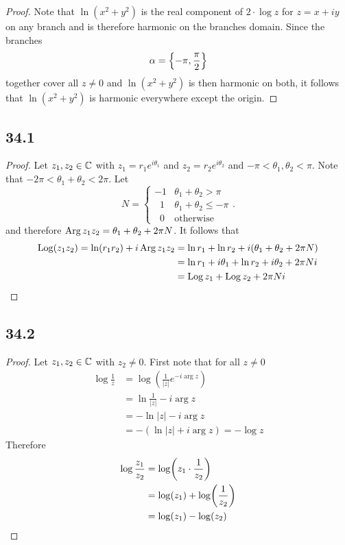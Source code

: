 \documentclass[12pt,titlepage]{extarticle}
\begin{document}
\begin{proof}
    Note that $\ln(x^2 + y^2)$ is the real component of $2\cdot\log z$ for $z = x + iy$ on any branch and is therefore harmonic on the branches domain. Since the branches
    \[
        \alpha = \qty{-\pi, \frac{\pi}{2}}
    \]
    together cover all $z \neq 0$ and $\ln(x^2 + y^2)$ is then harmonic on both, it follows that $\ln(x^2 + y^2)$ is harmonic everywhere except the origin.
\end{proof}

\subsection*{34.1}
\begin{proof}
    Let $z_1, z_2 \in \mathbb{C}$ with $z_1 = r_1 e^{i \theta_1}$ and $z_2 = r_2 e^{i \theta_2}$ and $- \pi < \theta_1, \theta_2 < \pi$. Note that $- 2 \pi < \theta_1 + \theta_2 < 2 \pi$. Let
    \[
        N = \begin{cases}
            -1 & \theta_1 + \theta_2 > \pi \\
            \;\;1 & \theta_1 + \theta_2 \leq -\pi \\
            \;\;0 & \text{otherwise}
        \end{cases}
    .\]
    and therefore $\operatorname{Arg}{z_1 z_2} = \theta_1 + \theta_2 + 2 \pi N$. It follows that
    \begin{align*}
        \operatorname{Log}(z_1 z_2) = \ln (r_1 r_2) + i\operatorname{Arg}{z_1 z_2} &= \ln r_1 + \ln r_2 + i (\theta_1 + \theta_2 + 2 \pi N) \\
        &= \ln r_1 + i \theta_1 + \ln r_2 + i \theta_2 + 2 \pi N i \\
        &= \operatorname{Log} z_1 + \operatorname{Log} z_2 + 2 \pi N i \qedhere
    \end{align*}
\end{proof}

\subsection*{34.2}
\begin{proof}
    Let $z_1, z_2 \in \mathbb{C}$ with $z_2 \neq 0$. First note that for all $z \neq 0$
    \begin{align*}
        \log \frac{1}{z} &= \log(\frac{1}{|z|} e^{-i \arg z}) \\
        &= \ln \frac{1}{|z|} - i \arg z \\
        &= - \ln |z| - i \arg z \\
        &= - (\ln|z| + i \arg z) = - \log z
    \end{align*}
    Therefore
    \begin{align*}
        \log \frac{z_1}{z_2} &= \log(z_1 \cdot \frac{1}{z_2}) \\
        &= \log(z_1) + \log(\frac{1}{z_2}) \\
        &= \log(z_1) - \log(z_2) \qedhere
    \end{align*}
\end{proof}
\end{document}
